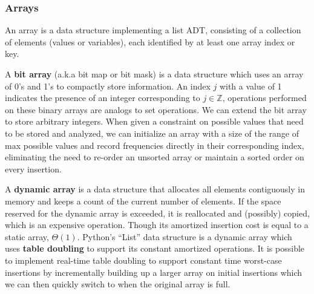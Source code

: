 \documentclass{article}
\begin{document}
    \subsubsection{Arrays}
    An array is a data structure implementing a list ADT, consisting of a collection of elements (values or variables), each identified by at least one array index or key. 
    
    A \textbf{bit array} (a.k.a bit map or bit mask) is a data structure which uses an array of 0's and 1's to compactly store information. An index $j$ with a value of 1 indicates the presence of an integer corresponding to $j \in \mathbb Z$, operations performed on these binary arrays are analogs to set operations. We can extend the bit array to store arbitrary integers. When given a constraint on possible values that need to be stored and analyzed, we can initialize an array with a size of the range of max possible values and record frequencies directly in their corresponding index, eliminating the need to re-order an unsorted array or maintain a sorted order on every insertion.
    
    A \textbf{dynamic array} is a data structure that allocates all elements contiguously in memory and keeps a count of the current number of elements. If the space reserved for the dynamic array is exceeded, it is reallocated and (possibly) copied, which is an expensive operation. Though its amortized insertion cost is equal to a static array, $\Theta(1)$. Python's  ``List'' data structure is a dynamic array which uses \textbf{table doubling} to support its constant amortized operations. It is possible to implement real-time table doubling to support constant time worst-case insertions by incrementally building up a larger array on initial insertions which we can then quickly switch to when the original array is full.
    
\end{document}
